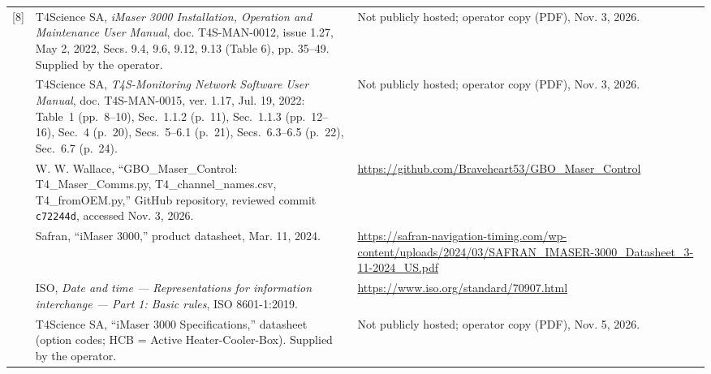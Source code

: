 \documentclass[11pt,a4paper]{article}
\begin{document}
\begin{longtable}{@{}p{.05\linewidth}p{.53\linewidth}p{.34\linewidth}@{}}
[8] & T4Science SA, \textit{iMaser 3000 Installation, Operation and Maintenance
User Manual}, doc. T4S-MAN-0012, issue 1.27, May 2, 2022, Secs. 9.4, 9.6, 9.12,
9.13 (Table 6), pp. 35--49. Supplied by the operator.
& Not publicly hosted; operator copy (PDF), Nov. 3, 2026.\\[5pt]
[9] & T4Science SA, \textit{T4S-Monitoring Network Software User Manual},
doc. T4S-MAN-0015, ver. 1.17, Jul. 19, 2022: Table~1 (pp.~8--10), Sec.~1.1.2 (p.~11),
Sec.~1.1.3 (pp.~12--16), Sec.~4 (p.~20), Secs.~5--6.1 (p.~21), Secs.~6.3--6.5 (p.~22), Sec.~6.7 (p.~24).
& Not publicly hosted; operator copy (PDF), Nov. 3, 2026.\\[5pt]
[10] & W. W. Wallace, ``GBO\_Maser\_Control: T4\_Maser\_Comms.py,
T4\_channel\_names.csv, T4\_fromOEM.py,'' GitHub repository, reviewed commit
\texttt{c72244d}, accessed Nov. 3, 2026.
& \url{https://github.com/Braveheart53/GBO_Maser_Control}\\[5pt]
[11] & Safran, ``iMaser 3000,'' product datasheet, Mar. 11, 2024.
& \url{https://safran-navigation-timing.com/wp-content/uploads/2024/03/SAFRAN_IMASER-3000_Datasheet_3-11-2024_US.pdf}\\[5pt]
[12] & ISO, \textit{Date and time --- Representations for information interchange ---
Part 1: Basic rules}, ISO 8601-1:2019.
& \url{https://www.iso.org/standard/70907.html}\\[5pt]
[13] & T4Science SA, ``iMaser 3000 Specifications,'' datasheet (option codes; HCB = Active
Heater-Cooler-Box). Supplied by the operator.
& Not publicly hosted; operator copy (PDF), Nov. 5, 2026.\\
\bottomrule
\end{longtable}
\normalsize
\end{document}

